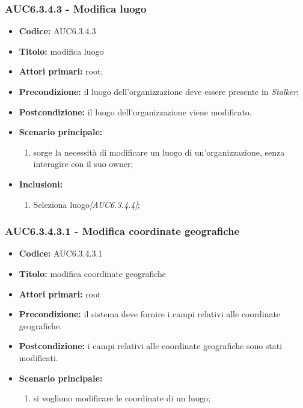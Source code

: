 \documentclass[casi-duso]{subfiles}
\begin{document}
\subsubsection{AUC6.3.4.3 - Modifica luogo}%
\label{subsub:AUC6.3.4.3}
\begin{itemize}
  \item \textbf{Codice:} AUC6.3.4.3
  \item \textbf{Titolo:} modifica luogo
  \item \textbf{Attori primari:} root;
  \item \textbf{Precondizione:} il luogo dell'organizzazione deve essere presente in \emph{Stalker};
  \item \textbf{Postcondizione:} il luogo dell'organizzazione viene modificato.
  \item \textbf{Scenario principale:}
  \begin{enumerate}
    \item sorge la necessità di modificare un luogo di un'organizzazione, senza interagire con il suo owner;
  \end{enumerate}
  \item \textbf{Inclusioni:}
  \begin{enumerate}
    \item Seleziona luogo\emph{[AUC6.3.4.4]};
  \end{enumerate}
\end{itemize}


\subsubsection{AUC6.3.4.3.1 - Modifica coordinate geografiche}%
\label{subsub:AUC6.3.4.3.1}
\begin{itemize}
  \item \textbf{Codice:} AUC6.3.4.3.1
  \item \textbf{Titolo:} modifica coordinate geografiche
  \item \textbf{Attori primari:} root
  \item \textbf{Precondizione:} il sistema deve fornire i campi relativi alle coordinate geografiche.
  \item \textbf{Postcondizione:} i campi relativi alle coordinate geografiche sono stati modificati.
  \item \textbf{Scenario principale:}
  \begin{enumerate}
    \item si vogliono modificare le coordinate di un luogo;
  \end{enumerate}
\end{itemize}
\end{document}
